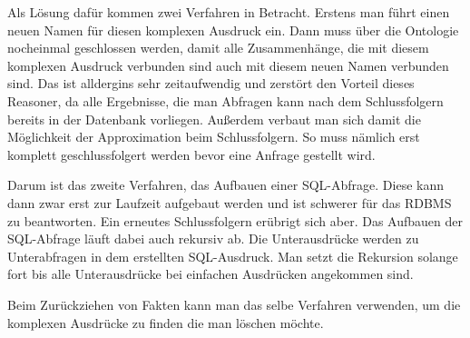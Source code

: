 Als Lösung dafür kommen zwei Verfahren in Betracht. Erstens man führt einen neuen Namen für diesen komplexen Ausdruck ein. Dann muss über die Ontologie nocheinmal geschlossen werden, damit alle Zusammenhänge, die mit diesem komplexen Ausdruck verbunden sind auch mit diesem neuen Namen verbunden sind. Das ist alldergins sehr zeitaufwendig und zerstört den Vorteil dieses Reasoner, da alle Ergebnisse, die man Abfragen kann nach dem Schlussfolgern bereits in der Datenbank vorliegen. Außerdem verbaut man sich damit die Möglichkeit der Approximation beim Schlussfolgern. So muss nämlich erst komplett geschlussfolgert werden bevor eine Anfrage gestellt wird.

Darum ist das zweite Verfahren, das Aufbauen einer SQL-Abfrage. Diese kann dann zwar erst zur Laufzeit aufgebaut werden und ist schwerer für das RDBMS zu beantworten. Ein erneutes Schlussfolgern erübrigt sich aber. Das Aufbauen der SQL-Abfrage läuft dabei auch rekursiv ab. Die Unterausdrücke werden zu Unterabfragen in dem erstellten SQL-Ausdruck. Man setzt die Rekursion solange fort bis alle Unterausdrücke bei einfachen Ausdrücken angekommen sind.

Beim Zurückziehen von Fakten kann man das selbe Verfahren verwenden, um die komplexen Ausdrücke zu finden die man löschen möchte.